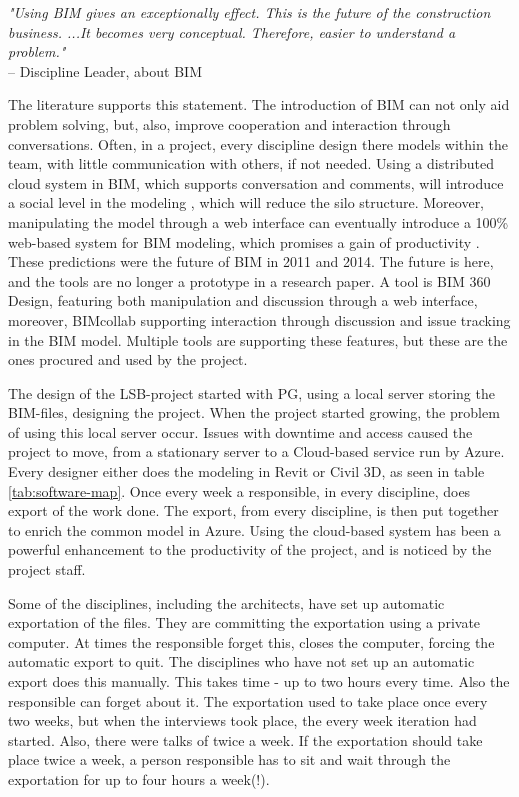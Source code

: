 \textit{"Using BIM gives an exceptionally effect. This is the future of the construction business. ...It becomes very conceptual. Therefore, easier to understand a problem."} \\
– Discipline Leader, about BIM

The literature supports this statement. The introduction of BIM can not only aid problem solving, but, also, improve cooperation and interaction through conversations. Often, in a project, every discipline design there models within the team, with little communication with others, if not needed. Using a distributed cloud system in BIM, which supports conversation and comments, will introduce a social level in the modeling \citep{das2014bimcloud}, which will reduce the silo structure. Moreover, manipulating the model through a web interface can eventually introduce a 100\% web-based system for BIM modeling, which promises a gain of productivity \citep{chuang2011applying}. These predictions were the future of BIM in 2011 and 2014. The future is here, and the tools are no longer a prototype in a research paper. A tool is BIM 360 Design, featuring both manipulation and discussion through a web interface, moreover, BIMcollab supporting interaction through discussion and issue tracking in the BIM model. Multiple tools are supporting these features, but these are the ones procured and used by the project. 

The design of the LSB-project started with PG, using a local server storing the BIM-files, designing the project. When the project started growing, the problem of using this local server occur. Issues with downtime and access caused the project to move, from a stationary server to a Cloud-based service run by Azure. Every designer either does the modeling in Revit or Civil 3D, as seen in table \ref{tab:software-map}. Once every week a responsible, in every discipline, does export of the work done. The export, from every discipline, is then put together to enrich the common model in Azure. Using the cloud-based system has been a powerful enhancement to the productivity of the project, and is noticed by the project staff. 

Some of the disciplines, including the architects, have set up automatic exportation of the files. They are committing the exportation using a private computer. At times the responsible forget this, closes the computer, forcing the automatic export to quit. The disciplines who have not set up an automatic export does this manually. This takes time - up to two hours every time. Also the responsible can forget about it. The exportation used to take place once every two weeks, but when the interviews took place, the every week iteration had started. Also, there were talks of twice a week. If the exportation should take place twice a week, a person responsible has to sit and wait through the exportation for up to four hours a week(!).

